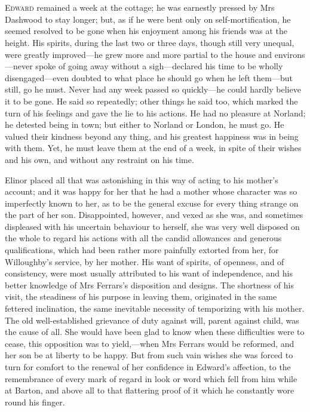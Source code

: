 \chapter[Chapter \thechapter]{}
\lettrine[lines=4,lraise=0.3]{E}{dward} remained a week at the cottage; he was earnestly pressed by Mrs Dashwood to stay longer; but, as if he were bent only on self-mortification, he seemed resolved to be gone when his enjoyment among his friends was at the height. His spirits, during the last two or three days, though still very unequal, were greatly improved—he grew more and more partial to the house and environs—never spoke of going away without a sigh—declared his time to be wholly disengaged—even doubted to what place he should go when he left them—but still, go he must. Never had any week passed so quickly—he could hardly believe it to be gone. He said so repeatedly; other things he said too, which marked the turn of his feelings and gave the lie to his actions. He had no pleasure at Norland; he detested being in town; but either to Norland or London, he must go. He valued their kindness beyond any thing, and his greatest happiness was in being with them. Yet, he must leave them at the end of a week, in spite of their wishes and his own, and without any restraint on his time.

Elinor placed all that was astonishing in this way of acting to his mother’s account; and it was happy for her that he had a mother whose character was so imperfectly known to her, as to be the general excuse for every thing strange on the part of her son. Disappointed, however, and vexed as she was, and sometimes displeased with his uncertain behaviour to herself, she was very well disposed on the whole to regard his actions with all the candid allowances and generous qualifications, which had been rather more painfully extorted from her, for Willoughby’s service, by her mother. His want of spirits, of openness, and of consistency, were most usually attributed to his want of independence, and his better knowledge of Mrs Ferrars’s disposition and designs. The shortness of his visit, the steadiness of his purpose in leaving them, originated in the same fettered inclination, the same inevitable necessity of temporizing with his mother. The old well-established grievance of duty against will, parent against child, was the cause of all. She would have been glad to know when these difficulties were to cease, this opposition was to yield,—when Mrs Ferrars would be reformed, and her son be at liberty to be happy. But from such vain wishes she was forced to turn for comfort to the renewal of her confidence in Edward’s affection, to the remembrance of every mark of regard in look or word which fell from him while at Barton, and above all to that flattering proof of it which he constantly wore round his finger.

